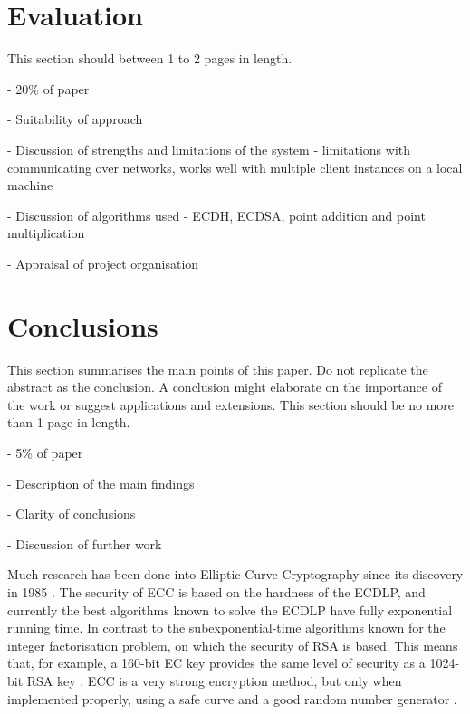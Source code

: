\documentclass[12pt,a4paper]{article}
\begin{document}
\section{Evaluation}
This section should between 1 to 2 pages in length.

- 20\% of paper

- Suitability of approach

- Discussion of strengths and limitations of the system - limitations with communicating over networks, works well with multiple client instances on a local machine

- Discussion of algorithms used - ECDH, ECDSA, point addition and point multiplication

- Appraisal of project organisation


\section{Conclusions}
This section summarises the main points of this paper. 
Do not replicate the abstract as the conclusion. 
A conclusion might elaborate on the importance of the work or suggest applications and extensions. 
This section should be no more than 1 page in length. 

- 5\% of paper

- Description of the main findings

- Clarity of conclusions

- Discussion of further work

Much research has been done into Elliptic Curve Cryptography since its discovery in 1985 \cite{10.1007/3-540-39799-X_31,koblitz1987elliptic}. 
The security of ECC is based on the hardness of the ECDLP, 
and currently the best algorithms known to solve the ECDLP have fully exponential running time. 
In contrast to the subexponential-time algorithms known for the integer factorisation problem, 
on which the security of RSA is based. 
This means that, for example, a 160-bit EC key provides the same level of security as a 1024-bit RSA key \cite{hankerson2003guide,silverman2009arithmetic}. 
ECC is a very strong encryption method, but only when implemented properly, 
using a safe curve \cite{bernstein2013safecurves,10.1007/11745853_14}
and a good random number generator \cite{hotz2010console}. 



\end{document}
